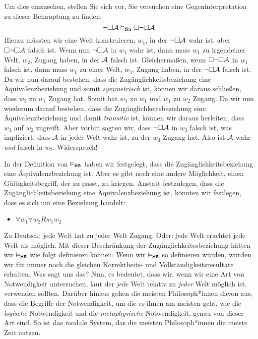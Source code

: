 Um dies einzusehen, stellen Sie sich vor, Sie versuchen eine Gegeninterpretation zu dieser Behauptung zu finden:
\[
	\neg\Box\mathcal{A} \vDash_{\mathbf{S5}}  \Box \neg\Box \mathcal{A}
\]
Hierzu müssten wir eine Welt konstruieren, $w_1$, in der $\neg\Box\mathcal{A}$ wahr ist, aber $\Box \neg\Box \mathcal{A}$ falsch ist. Wenn nun $\neg\Box\mathcal{A}$ in $w_1$ wahr ist, dann muss $w_1$ zu irgendeiner Welt, $w_2$, Zugang haben, in der $\mathcal{A}$ falsch ist. Gleichermaßen, wenn $\Box \neg\Box \mathcal{A}$ in $w_1$ falsch ist, dann muss $w_1$ zu einer Welt, $w_3$, Zugang haben, in der $\neg\Box \mathcal{A}$ falsch ist. Da wir nun darauf bestehen, dass die Zugänglichkeitsbeziehung eine Äquivalenzbeziehung und somit \emph{symmetrisch} ist, können wir daraus schließen, dass $w_3$ zu $w_1$ Zugang hat. Somit hat $w_3$ zu $w_1$ und $w_1$ zu $w_2$ Zugang. Da wir nun wiederum darauf bestehen, dass die Zugänglichkeitsbeziehung eine Äquivalenzbeziehung und damit \emph{transitiv} ist, können wir daraus herleiten, dass $w_3$ auf $w_2$ zugreift. Aber vorhin sagten wir, dass $\neg\Box \mathcal{A}$ in $w_3$ falsch ist, was impliziert, dass $\mathcal{A}$ in jeder Welt wahr ist, zu der $w_3$ Zugang hat. Also ist $\mathcal{A}$ wahr \emph{und} falsch in $w_2$. Widerspruch!

In der Definition von $\vDash_{\mathbf{S5}} $ haben wir festgelegt, dass die Zugänglichkeitsbeziehung eine Äquivalenzbeziehung ist. Aber es gibt noch eine andere Möglichkeit, einen Gültigkeitsbegriff, der zu \mlSfive passt, zu kriegen. Anstatt festzulegen, dass die Zugänglichkeitsbeziehung eine Äquivalenzbeziehung ist, könnten wir festlegen, dass es sich um eine  Beziehung handelt:
\begin{itemize}
	\item $\forall w_1\forall w_2Rw_1w_2$
\end{itemize}
Zu Deutsch: jede Welt hat zu jeder Welt Zugang. Oder: jede Welt erachtet jede Welt als möglich. Mit dieser Beschränkung der Zugänglichkeitesbeziehung hätten wir $\vDash_{\mathbf{S5}} $ wie folgt definieren können:
Wenn wir $\vDash_{\mathbf{S5}} $ so definieren würden, würden wir für \mlSfive immer noch die gleichen Korrektheits- und Vollständigkeitsresultate erhalten. Was sagt uns das? Nun, es bedeutet, dass wir, wenn wir eine Art von Notwendigkeit untersuchen, laut der \emph{jede} Welt relativ zu \emph{jeder} Welt möglich ist, \mlSfive verwenden sollten. Darüber hinaus gehen die meisten Philosoph*innen davon aus, dass die Begriffe der Notwendigkeit, um die es ihnen am meisten geht, wie die \emph{logische} Notwendigkeit und die \emph{metaphysische} Notwendigkeit, genau von dieser Art sind. So ist \mlSfive{} das modale System, das die meisten Philosoph*innen die meiste Zeit nutzen.

